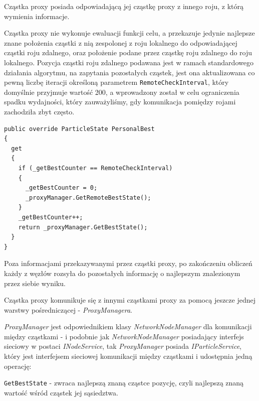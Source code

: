 \documentclass[12pt, twoside, openany, abstract=on]{report}
\theoremstyle{definition}
\begin{document}
Cząstka proxy posiada odpowiadającą jej cząstkę proxy z innego roju, z którą wymienia informacje.

Cząstka proxy nie wykonuje ewaluacji funkcji celu, a przekazuje jedynie najlepsze znane położenia cząstki z nią zespolonej z roju lokalnego do odpowiadającej cząstki roju zdalnego, oraz położenie podane przez cząstkę roju zdalnego do roju lokalnego. Pozycja cząstki roju zdalnego podawana jest w ramach standardowego działania algorytmu, na zapytania pozostałych cząstek, jest ona aktualizowana co pewną liczbę iteracji określoną parametrem \texttt{RemoteCheckInterval}, który domyślnie przyjmuje wartość 200, a wprowadzony został w celu ograniczenia spadku wydajności, który zauważyliśmy, gdy komunikacja pomiędzy rojami zachodziła zbyt często.

\lstset{style=sharpc}
\begin{lstlisting}[frame=single]
public override ParticleState PersonalBest
{
  get
  {
    if (_getBestCounter == RemoteCheckInterval)
    {
      _getBestCounter = 0;
      _proxyManager.GetRemoteBestState();
    }
    _getBestCounter++;
    return _proxyManager.GetBestState();
  }
}
\end{lstlisting}


Poza informacjami przekazywanymi przez cząstki proxy, po zakończeniu obliczeń każdy z węzłów rozsyła do pozostałych informację o najlepszym znalezionym przez siebie wyniku.

Cząstka proxy komunikuje się z innymi cząstkami proxy za pomocą jeszcze jednej warstwy pośredniczącej - \textit{ProxyManagera}.

\textit{ProxyManager} jest odpowiednikiem klasy \textit{NetworkNodeManager} dla komunikacji między cząstkami - i podobnie jak \textit{NetworkNodeManager} posiadający interfejs sieciowy w postaci \textit{INodeService}, tak \textit{ProxyManager} posiada \textit{IParticleService}, który jest interfejsem sieciowej komunikacji między cząstkami i udostępnia jedną operację:

\texttt{GetBestState} - zwraca najlepszą znaną cząstce pozycję, czyli najlepszą znaną wartość wśród cząstek jej sąsiedztwa.
\end{document}
